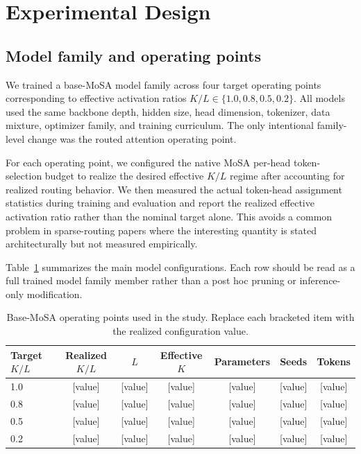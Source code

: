 \documentclass[11pt]{article}
\begin{document}
\section{Experimental Design}
\label{sec:setup}

\subsection{Model family and operating points}

We trained a base-MoSA model family across four target operating points corresponding to effective activation ratios $K/L \in \{1.0, 0.8, 0.5, 0.2\}$. All models used the same backbone depth, hidden size, head dimension, tokenizer, data mixture, optimizer family, and training curriculum. The only intentional family-level change was the routed attention operating point.

For each operating point, we configured the native MoSA per-head token-selection budget to realize the desired effective $K/L$ regime after accounting for realized routing behavior. We then measured the actual token-head assignment statistics during training and evaluation and report the realized effective activation ratio rather than the nominal target alone. This avoids a common problem in sparse-routing papers where the interesting quantity is stated architecturally but not measured empirically.

Table~\ref{tab:config} summarizes the main model configurations. Each row should be read as a full trained model family member rather than a post hoc pruning or inference-only modification.

\begin{table}[H]
\centering
\caption{Base-MoSA operating points used in the study. Replace each bracketed item with the realized configuration value.}
\label{tab:config}
\begin{tabular}{lcccccc}
\toprule
Target $K/L$ & Realized $K/L$ & $L$ & Effective $K$ & Parameters & Seeds & Tokens \\
\midrule
1.0 & [value] & [value] & [value] & [value] & [value] & [value] \\
0.8 & [value] & [value] & [value] & [value] & [value] & [value] \\
0.5 & [value] & [value] & [value] & [value] & [value] & [value] \\
0.2 & [value] & [value] & [value] & [value] & [value] & [value] \\
\bottomrule
\end{tabular}
\end{table}
\end{document}
